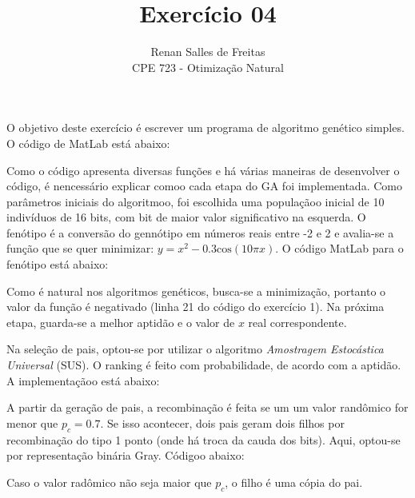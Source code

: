 \documentclass[12pt]{article}
\newenvironment{exercise}[2][Exercício]{\begin{trivlist}
\item[\hskip \labelsep {\bfseries #1}\hskip \labelsep {\bfseries #2.}]}{\end{trivlist}}
\begin{document}
 
 
\title{Exercício 04}
\author{Renan Salles de Freitas\\
CPE 723 - Otimização Natural}
 
\maketitle
 
\begin{exercise}{1}
O objetivo deste exercício é escrever um programa de algoritmo genético simples.
O código de MatLab está abaixo:


Como o código apresenta diversas funções e há várias maneiras de desenvolver o
código, é nencessário explicar comoo cada etapa do GA foi implementada. Como
parâmetros iniciais do algoritmoo, foi escolhida uma populaçãoo inicial de 10
indivíduos de 16 bits, com bit de maior valor significativo na esquerda. O
fenótipo é a conversão do gennótipo em números reais entre -2 e 2 e avalia-se
a função que se quer minimizar: $y = x^2 - 0.3\text{cos}(10\pi x)$. O código
MatLab para o fenótipo está abaixo:




Como é natural nos algoritmos genéticos, busca-se a minimização, portanto o
valor da função é negativado (linha 21 do código do exercício 1). Na próxima
etapa, guarda-se a melhor aptidão e o valor de $x$ real correspondente.

Na seleção de pais, optou-se por utilizar o algoritmo \textit{Amostragem
Estocástica Universal} (SUS). O ranking é feito com probabilidade, de acordo
com a aptidão. A implementaçãoo está abaixo:



A partir da geração de pais, a recombinação é feita se um um valor randômico for
menor que $p_c = 0.7$. Se isso acontecer, dois pais geram dois filhos por
recombinação do tipo 1 ponto (onde há troca da cauda dos bits). Aqui, optou-se
por representação binária Gray. Códigoo abaixo:
 

Caso o valor radômico não seja maior que $p_c$, o filho é uma cópia do pai.


\end{exercise}
\end{document}
